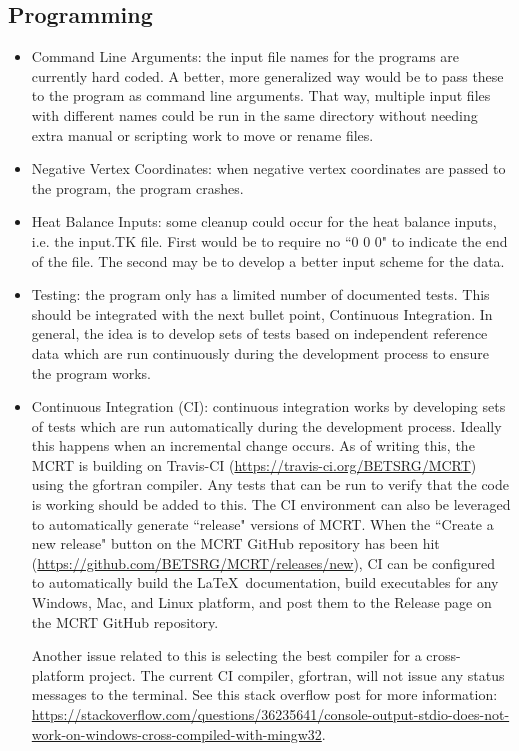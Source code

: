 \documentclass{article}
\begin{document}
\subsection{Programming}

\begin{itemize}
    \item Command Line Arguments: the input file names for the programs are currently hard coded. A better, more generalized way would be to pass these to the program as command line arguments. That way, multiple input files with different names could be run in the same directory without needing extra manual or scripting work to move or rename files.

    \item Negative Vertex Coordinates: when negative vertex coordinates are passed to the program, the program crashes.

    \item Heat Balance Inputs: some cleanup could occur for the heat balance inputs, i.e. the input.TK file. First would be to require no ``0 0 0" to indicate the end of the file. The second may be to develop a better input scheme for the data.

    \item Testing: the program only has a limited number of documented tests. This should be integrated with the next bullet point, Continuous Integration. In general, the idea is to develop sets of tests based on independent reference data which are run continuously during the development process to ensure the program works.

    \item Continuous Integration (CI): continuous integration works by developing sets of tests which are run automatically during the development process. Ideally this happens when an incremental change occurs. As of writing this, the MCRT is building on Travis-CI (\url{https://travis-ci.org/BETSRG/MCRT}) using the gfortran compiler. Any tests that can be run to verify that the code is working should be added to this. The CI environment can also be leveraged to automatically generate ``release" versions of MCRT. When the ``Create a new release" button on the MCRT GitHub repository has been hit (\url{https://github.com/BETSRG/MCRT/releases/new}), CI can be configured to automatically build the \LaTeX ~documentation, build executables for any Windows, Mac, and Linux platform, and post them to the Release page on the MCRT GitHub repository.
    
    Another issue related to this is selecting the best compiler for a cross-platform project. The current CI compiler, gfortran, will not issue any status messages to the terminal. See this stack overflow post for more information: \url{https://stackoverflow.com/questions/36235641/console-output-stdio-does-not-work-on-windows-cross-compiled-with-mingw32}.


\end{itemize}
\end{document}
